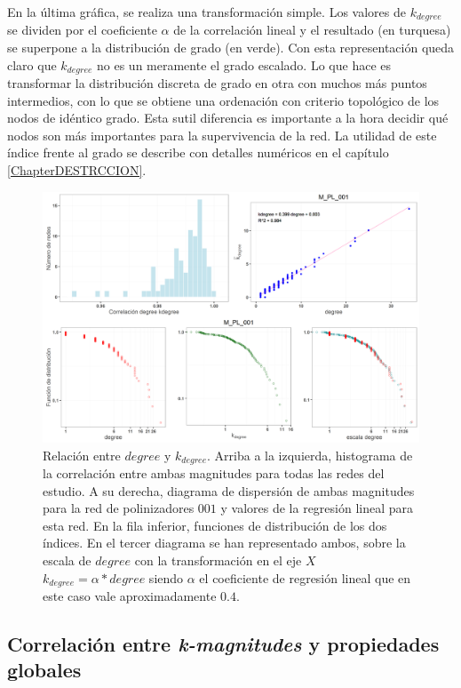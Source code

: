 En la última gráfica, se realiza una transformación simple. Los valores de $k_{degree}$ se dividen por el coeficiente $\alpha$ de la correlación lineal y el resultado (en turquesa) se superpone a la distribución de grado (en verde). Con esta representación queda claro que $k_{degree}$ no es un meramente el grado escalado. Lo que hace es transformar la distribución discreta de grado en otra con muchos más puntos intermedios, con lo que se obtiene una ordenación con criterio topológico de los nodos de idéntico grado. Esta sutil diferencia es importante a la hora decidir qué nodos son más importantes para la supervivencia de la red. La utilidad de este índice frente al grado se describe con detalles numéricos en el capítulo \ref{ChapterDESTRCCION}.

\begin{figure}[h!]
\centering
\includegraphics[scale=0.5]{Figures/ESTATICA_ALL_plots_kdegree_degree_M_PL_001_ES.png}
\caption{Relación entre $degree$ y $k_{degree}$. Arriba a la izquierda, histograma de la correlación entre ambas magnitudes para todas las redes del estudio. A su derecha, diagrama de dispersión de ambas magnitudes para la red de polinizadores $001$ y valores de la regresión lineal para esta red. En la fila inferior, funciones de distribución de los dos índices. En el tercer diagrama se han representado ambos, sobre la escala de $degree$ con la transformación en el eje $X$ $k_{degree} = \alpha * degree$ siendo $\alpha$ el coeficiente de regresión lineal que en este caso vale aproximadamente $0.4$.}
\label{fig:ESTATICA_ALL_plots_kdegree_degree_M_PL_001_ES}
\end{figure}


\subsection{Correlación entre \textit{k-magnitudes} y propiedades globales}
\label{subsection:Correlacion}

